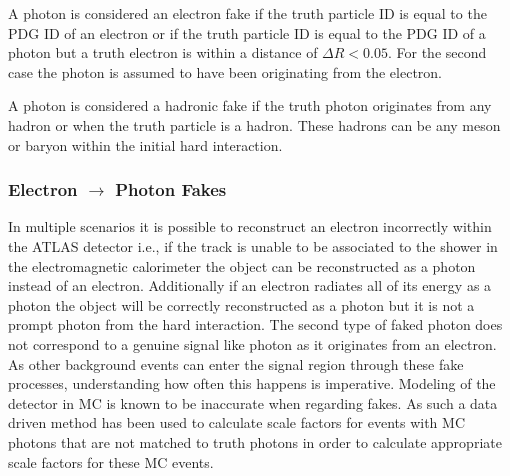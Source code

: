 A photon is considered an electron fake if the truth particle ID is equal to the PDG ID of an electron or if the truth particle ID is equal to the PDG ID of a photon but a truth electron is within a distance of $\Delta R < 0.05$.  For the second case the photon is assumed to have been originating from the electron.  

A photon is considered a hadronic fake if the truth photon originates from any hadron or when the truth particle is a hadron.  These hadrons can be any meson or baryon within the initial hard interaction.

\subsubsection{Electron $\rightarrow$ Photon Fakes}
\label{sec:FakePho}

In multiple scenarios it is possible to reconstruct an electron incorrectly within the ATLAS detector i.e., if the track is unable to be associated to the shower in the electromagnetic calorimeter the object can be reconstructed as a photon instead of an electron.  Additionally if an electron radiates all of its energy as a photon the object will be correctly reconstructed as a photon but it is not a prompt photon from the hard interaction.  The second type of faked photon does not correspond to a genuine signal like photon as it originates from an electron.  As other background events can enter the signal region through these fake processes, understanding how often this happens is imperative.  Modeling of the detector in MC is known to be inaccurate when regarding fakes.  As such a data driven method has been used to calculate scale factors for events with MC photons that are not matched to truth photons in order to calculate appropriate scale factors for these MC events.

